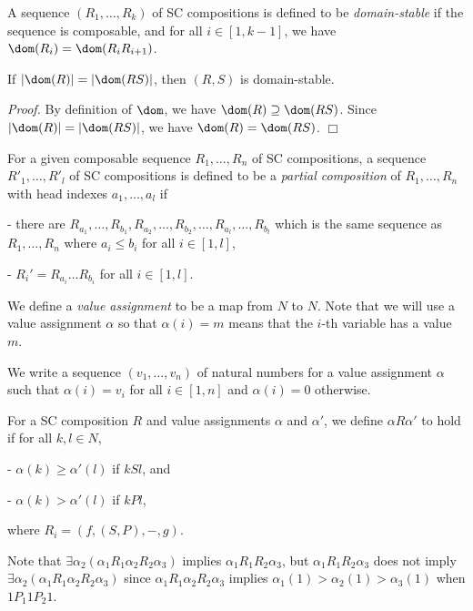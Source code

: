 \begin{Def}\rm
A sequence $(R_1,\ldots,R_k)$ of SC compositions
is defined to be {\em domain-stable}
if 
the sequence is composable, and
for all $i \in [1,k-1]$, 
we have $\dom(R_i) = \dom(R_iR_{i+1})$.
\end{Def}

\begin{Lemma}\label{lemma:cardinal}
If $|\dom(R)|=|\dom(RS)|$, then $(R,S)$ is domain-stable.
\end{Lemma}

{\em Proof.}
By definition of $\dom$, we have $\dom(R) \supseteq \dom(RS)$.
Since $|\dom(R)|=|\dom(RS)|$, we have $\dom(R) = \dom(RS)$.
$\Box$

\begin{Def}\rm
For a given composable sequence $R_1,\ldots,R_n$ of SC compositions,
a sequence $R'_1,\ldots,R'_l$ of SC compositions
is defined to be a {\em partial composition} of $R_1,\ldots,R_n$
with head indexes $a_1,\ldots,a_l$
if 

- there are $R_{a_1},\ldots,R_{b_1},R_{a_2},\ldots,R_{b_2},\ldots, R_{a_l},\ldots,R_{b_l}$
which is the same sequence as $R_1,\ldots,R_n$
where $a_i \le b_i$ for all $i \in [1,l]$,

- $R_i' = R_{a_i}\ldots R_{b_i}$ for all $i \in [1,l]$.
\end{Def}

\begin{Def}\rm
We define a {\em value assignment} to be a map from $N$ to $N$.
Note that we will use a value assignment $\alpha$ so that
$\alpha(i)=m$ means that the $i$-th variable has a value $m$.

We write a sequence $(v_1,\ldots,v_n)$ of natural numbers for
a value assignment $\alpha$ such that
$\alpha(i)=v_i$ for all $i \in [1,n]$ and
$\alpha(i)=0$ otherwise.

For a SC composition $R$ and value assignments $\alpha$ and $\alpha'$,
we define $\alpha R \alpha'$ to hold if for all $k,l \in N$,

- $\alpha(k) \ge \alpha'(l)$ if $k S l$, and

- $\alpha(k) > \alpha'(l)$ if $k P l$,

where
$R_i = (f,(S,P),-,g)$.
\end{Def}

Note that $\exists \alpha_2(\alpha_1 R_1 \alpha_2 R_2 \alpha_3)$ 
implies $\alpha_1 R_1R_2 \alpha_3$, but
$\alpha_1 R_1R_2 \alpha_3$ does not imply 
 $\exists \alpha_2(\alpha_1 R_1 \alpha_2 R_2 \alpha_3)$ 
since $\alpha_1 R_1 \alpha_2 R_2 \alpha_3$ implies 
$\alpha_1(1) > \alpha_2(1) > \alpha_3(1)$ 
when $1 P_1 1 P_2 1$.

